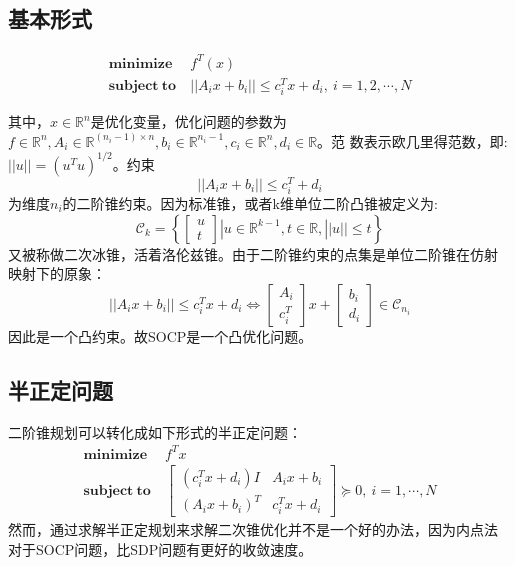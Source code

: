 \documentclass[fontset=none,oneside]{book}
\begin{document}
\subsection{基本形式\cite{Lobo:1998aa}}
\begin{shaded}
\begin{equation}
\label{eq:4}
\begin{split}
\mathbf{minimize}~ &f^{T}(x) \\
\mathbf{subject~to}~& ||A_{i}x+b_{i}|| \leq c_{i}^{T}x+d_{i},~i=1,2,\cdots,N
\end{split}
\end{equation}
\end{shaded}
其中，$x\in \mathbb{R}^{n}$是优化变量，优化问题的参数为$f\in
\mathbb{R}^{n},A_{i}\in \mathbb{R}^{(n_{i}-1)\times n},b_{i}\in
\mathbb{R}^{n_{i}-1},c_{i}\in \mathbb{R}^{n},d_{i}\in \mathbb{R}$。范
数表示欧几里得范数，即:$||u||=(u^{T}u)^{1/2}$。约束
\begin{equation}
\label{eq:5}
||A_{i}x+b_{i}||\leq c_{i}^{T}+d_{i}
\end{equation}
为维度$n_{i}$的二阶锥约束。因为标准锥，或者k维单位二阶凸锥被定义为:
\begin{equation}
\label{eq:6}
\mathscr{C}_{k}=\left\{\begin{bmatrix}u\\t\end{bmatrix}|u\in\mathbb{R}^{k-1},t\in\mathbb{R},||u||\leq t\right\}
\end{equation}
又被称做二次冰锥，活着洛伦兹锥。由于二阶锥约束的点集是单位二阶锥在仿射
映射下的原象：
\begin{equation}
\label{eq:7}
||A_{i}x+b_{i}||\leq c_{i}^{T}x+d_{i} \Longleftrightarrow \begin{bmatrix}A_{i}\\c_{i}^{T}\end{bmatrix}x+\begin{bmatrix}b_{i}\\d_{i}\end{bmatrix}\in\mathscr{C}_{n_{i}}
\end{equation}
因此是一个凸约束。故SOCP是一个凸优化问题。
\subsection{半正定问题}
二阶锥规划可以转化成如下形式的半正定问题：
\begin{equation}
\label{eq:8}
\begin{split}
\mathbf{minimize}~&f^{T}x \\
\mathbf{subject~to}~&\begin{bmatrix}(c_{i}^{T}x+d_{i})I &
  A_{i}x+b_{i}\\ (A_{i}x+b_{i})^{T} & c_{i}^{T}x+d_{i} \end{bmatrix}
\succeq 0,~i=1,\cdots,N
\end{split}
\end{equation}
然而，通过求解半正定规划来求解二次锥优化并不是一个好的办法，因为内点法
对于SOCP问题，比SDP问题有更好的收敛速度。
\end{document}
